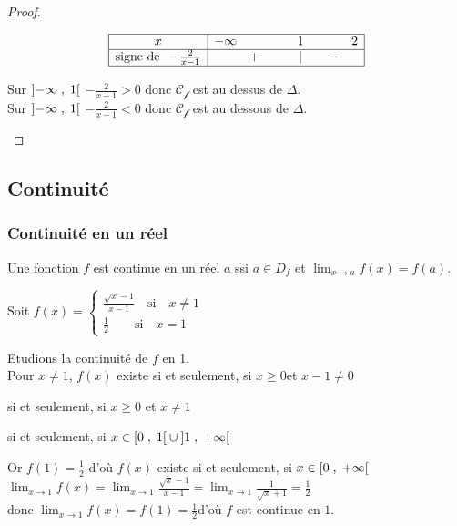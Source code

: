 \begin{proof}
\begin{enumerate}
  \[\begin{array}{|c|ccccc|}
\hline
x & -\infty & & 1 & & 2\\ \hline
\text{signe de }-\frac{2}{x-1}  & & +\qquad &|  & \quad - & \\
\hline
\end{array}\]
 
  Sur $ \left]-\infty \;,\; 1\right[ $ $-\frac{2}{x-1} > 0  $ donc $ \mathcal{C_{f}} $ est au dessus de $ \Delta. $\\
   Sur $ \left]-\infty \;,\; 1\right[ $ $-\frac{2}{x-1} < 0  $ donc $ \mathcal{C_{f}} $ est au dessous de $ \Delta. $
\end{enumerate}
\end{proof}
\subsection{Continuité}
\subsubsection*{Continuité en un réel}

\begin{definition}
Une fonction $ f $ est continue en un réel $ a $ ssi $ a\in D_{f} $ et $\displaystyle \lim_{x \to a}f(x)=f(a) $.
\end{definition}


\begin{example}
Soit $ f (x)=\left\{\begin{array}{l} \frac{\sqrt{x}-1}{x-1}\quad \textrm{si} \quad x\neq 1 \\ \frac{1}{2}\quad \quad\textrm{si}\quad x= 1  \end{array} \right.$


Etudions la continuité   de $ f $ en 1.\\
 Pour $x\neq 1  $, $ f(x) $ existe si et seulement, si $ x\geq 0 $\quad et $x-1 \neq 0 $
 
si et seulement, si \quad $x\geq 0$ \quad   et $x\neq 1$

si et seulement, si $x\in \left[0 \;,\; 1\right[\cup\left]1 \;,\; +\infty\right[$

Or $ f(1)= \frac{1}{2}$  d'où $ f(x) $ existe si et seulement, si  $x\in \left[0 \;,\; +\infty\right[  $ \\
$ \displaystyle\lim_{x \to 1}f(x)=\displaystyle\lim_{x \to 1}\frac{\sqrt{x}-1}{x-1}= \displaystyle\lim_{x \to 1}\frac{1}{\sqrt{x}+1}= \frac{1}{2}$ \\donc $\displaystyle \lim_{x \to 1}f(x)=f(1)=\frac{1}{2}$\quad d'où $ f $ est continue en $ 1. $
\end{example}

